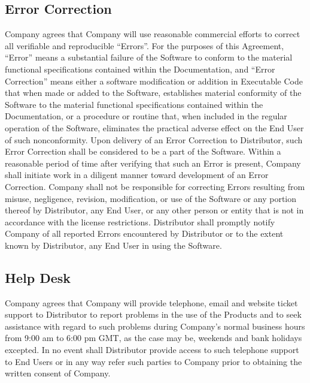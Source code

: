\documentclass[letterpaper,10pt,english]{sphinxmanual}
\begin{document}
\subsection{Error Correction}
\label{\detokenize{maintenanceservice:error-correction}}
Company agrees that Company will use reasonable commercial efforts to correct all verifiable and reproducible “Errors”. For the purposes of this Agreement, “Error” means a substantial failure of the Software to conform to the material functional specifications contained within the Documentation, and “Error Correction” means either a software modification or addition in Executable Code that when made or added to the Software, establishes material conformity of the Software to the material functional specifications contained within the Documentation, or a procedure or routine that, when included in the regular operation of the Software, eliminates the practical adverse effect on the End User of such nonconformity. Upon delivery of an Error Correction to Distributor, such Error Correction shall be considered to be a part of the Software. Within a reasonable period of time after verifying that such an Error is present, Company shall initiate work in a diligent manner toward development of an Error Correction. Company shall not be responsible for correcting Errors resulting from misuse, negligence, revision, modification, or use of the Software or any portion thereof by Distributor, any End User, or any other person or entity that is not in accordance with the license restrictions.  Distributor shall promptly notify Company of all reported Errors encountered by Distributor or to the extent known by Distributor, any End User in using the Software.


\subsection{Help Desk}
\label{\detokenize{maintenanceservice:help-desk}}
Company agrees that Company will provide telephone, email and website ticket support to Distributor to report problems in the use of the Products and to seek assistance with regard to such problems during Company’s normal business hours from 9:00 am to 6:00 pm GMT, as the case may be, weekends and bank holidays excepted. In no event shall Distributor provide access to such telephone support to End Users or in any way refer such parties to Company prior to obtaining the written consent of Company.
\end{document}
